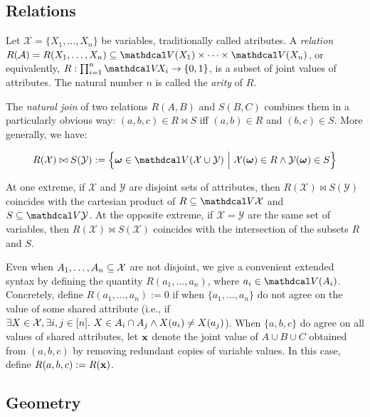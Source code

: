 {\begin{subappendices}
\subsection{Relations}

Let $\mathcal X = \{ X_1, \ldots, X_n \}$ be variables, traditionally called atributes. 
A \emph{relation} $R(\mathcal A) = R(X_1, \ldots, X_n) \subseteq 
\V(X_1) \times \cdots \times \V(X_n)$, or equivalently, $R : \prod_{i=1}^n \V\!X_i \to \{0,1\}$, is a subset of joint values of attributes. 
The natural number $n$ is called the \emph{arity} of $R$. 


The \emph{natural join} of two relations $R(A,B)$ and $S(B,C)$ combines them in a particularly obvious way: $(a,b,c) \in R \bowtie S$ iff $(a,b) \in R$ and $(b,c) \in S$. 
More generally, we have: 

\begin{equation}
    R(\mathcal X) \bowtie S(\mathcal Y)
        := 
        \Big\{
            \boldsymbol\omega \in  \V(\mathcal X \cup \mathcal Y)
            ~\Big|~
            \mathcal X(\boldsymbol\omega) \in R \land
            \mathcal Y(\boldsymbol\omega) \in S
        \Big\}
\end{equation}

At one extreme, if $\mathcal X$ and $\mathcal Y$ are disjoint sets of attributes, then $R(\mathcal X) \bowtie S(\mathcal Y)$ coincides with the cartesian product of $R \subseteq \V \mathcal X$ and $S \subseteq \V\mathcal Y$.
At the opposite extreme, if $\mathcal X = \mathcal Y$ are the same set of variables, then $R(\mathcal X) \bowtie S(\mathcal X)$ coincides with the intersection of the subsets $R$ and $S$. 

Even when $A_1, \ldots, A_n \subseteq \mathcal X$ are not disjoint, we give a convenient extended syntax by defining the quantity $R(a_1, \ldots, a_n)$, where $a_i \in \V(A_i)$. 
Concretely, define $R(a_1,\ldots, a_n) := 0$ if when $\{a_1, \ldots, a_n\}$ do not agree on the value of some shared attribute (i.e., if $\exists X \in \mathcal X, \exists i,j \in [n]. ~X \in A_i \cap A_j \land X(a_i) \ne X(a_j)$).
When $\{a,b,c\}$ do agree on all values of shared attributes, let $\mathbf x$ denote the joint value of $A \cup B \cup C$ obtained from $(a,b,c)$ by removing redundant copies of variable values.
In this case, define $R(a,b,c) := R(\mathbf x)$. 


\subsection{Geometry}

    
\end{subappendices}
}
